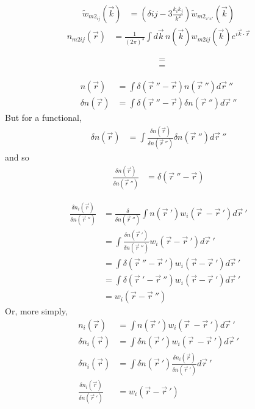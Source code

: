 \documentclass[double,12pt]{beavtex}
\begin{document}
\begin{align}
    \widetilde{w}_{m2_{ij}}(\vec{k}) &= (\delta{ij}-3\frac{k_ik_j}{k^2})
                                    \widetilde{w}_{{m2}_{x'x'}}(\vec{k})
\end{align}
\begin{align}
    n_{m2ij}(\vec r) &=  \frac{1}{\left(2\pi\right)^3}\int d\vec k\, 
                       n(\vec k) w_{m2ij}(\vec k)e^{i\vec k\cdot \vec r}
\end{align} 

\color{white}
\begin{align}
     &=  \\ 
     &= 
\end{align} 
\color{black}

\begin{align} 
  n(\vec r) &= \int \delta (\vec r~''-\vec r)n(\vec r~'') d\vec r~''\\
  \delta n(\vec r) &= \int \delta (\vec r~''-\vec r)\delta n(\vec r~'')
  d\vec r~''
\end{align} 
But for a functional,
\begin{align} 
\delta n(\vec r) &= \int \frac{\delta n(\vec r)}{\delta n(\vec r~'')}
\delta n(\vec r~'')d\vec r~''
\end{align} 
and so
\begin{align} 
  \frac{\delta n(\vec r)}{\delta n(\vec r~'')} &= \delta (\vec r~''-\vec r)
\end{align} 

\begin{align} 
   \frac{\delta n_i(\vec r)}{\delta n(\vec r~'')}  &= \frac{\delta}
   {\delta n(\vec r~'')}\int n(\vec r~')w_i(\vec r~-\vec r~')d\vec r~'\\
   &= \int \frac{\delta n(\vec r~')}{\delta n(\vec r~'')}w_i(\vec r
   -\vec r~') d\vec r~' \\
   &= \int \delta (\vec r~'' -\vec r~')w_i(\vec r-\vec r~') d\vec r~'\\
   &= \int \delta (\vec r~' -\vec r~'')w_i(\vec r-\vec r~') d\vec r~'\\
   &= w_i(\vec r-\vec r~'') 
\end{align}
Or, more simply,
\begin{align} 
   n_i(\vec r)  &= \int n(\vec r~')w_i(\vec r~-\vec r~')d\vec r~'\\
   \delta n_i(\vec r)  &= \int \delta n(\vec r~')w_i(\vec r~-\vec r~')d\vec r~'\\
   \delta n_i(\vec r)  &= \int \delta n(\vec r~')\frac{\delta n_i(\vec r)}{\delta n(\vec r~')}d\vec r~'\\
   \frac{\delta n_i(\vec r)}{\delta n(\vec r~')}&= w_i(\vec r-\vec r~') 
\end{align}
\end{document}
